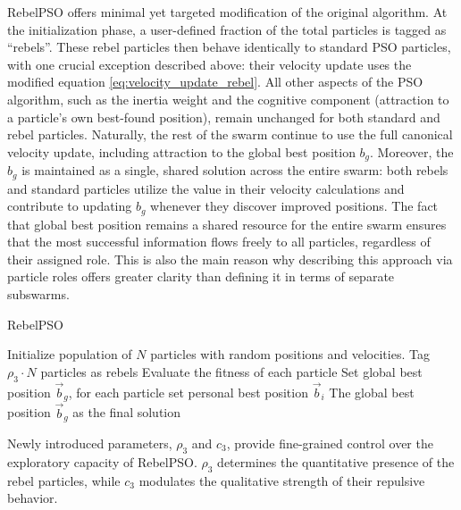 {RebelPSO offers minimal yet targeted modification of the original algorithm.
At the initialization phase, a user-defined fraction of the total particles is tagged as ``rebels''. These rebel particles then behave identically to standard PSO particles, with one crucial exception described above:  their velocity update uses the modified equation \eqref{eq:velocity_update_rebel}. All other aspects of the PSO algorithm, such as the inertia weight and the cognitive component (attraction to a particle's own best-found position), remain unchanged for both standard and rebel particles. Naturally, the rest of the swarm continue to use the full canonical velocity update, including attraction to the global best position $b_g$. Moreover, the $b_g$ is maintained as a single, shared solution across the entire swarm: both rebels and standard particles utilize the value in their velocity calculations and contribute to updating $b_g$ whenever they discover improved positions. The fact that global best position  remains a shared resource for the entire swarm ensures that the most successful information flows freely to all particles, regardless of their assigned role.
This is also the main reason why describing this approach via particle roles offers greater clarity than defining it in terms of separate subswarms.
\vspace{.935em}

\begin{algorithm}[H]
\caption{RebelPSO}\label{alg:rebel}
Initialize population of \(N\) particles with random positions and velocities. Tag \(\rho_3 \cdot N\) particles as rebels\;
Evaluate the fitness of each particle\;
Set global best position \(\vec{b}_g\), for each particle set personal best position \(\vec{b}_i\)\;
\Return The global best position \(\vec{b}_g\) as the final solution\;
\end{algorithm}

\vspace{.935em}
Newly introduced parameters, $\rho_3$ and $c_3$, provide fine-grained control over the exploratory capacity of RebelPSO. $\rho_3$ determines the quantitative presence of the rebel particles, while $c_3$ modulates the qualitative strength of their repulsive behavior.

}
